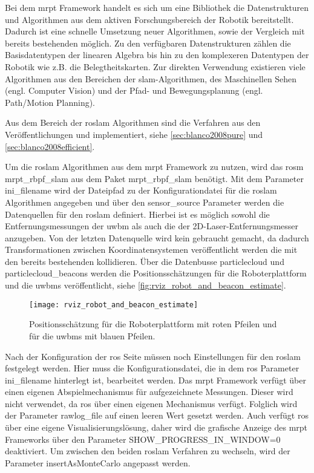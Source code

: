 Bei dem \Gls{mrpt} Framework handelt es sich um eine Bibliothek die Datenstrukturen und Algorithmen aus dem aktiven Forschungsbereich der Robotik bereitstellt. Dadurch ist eine schnelle Umsetzung neuer Algorithmen, sowie der Vergleich mit bereits bestehenden möglich. Zu den verfügbaren Datenstrukturen zählen die Basisdatentypen der linearen Algebra bis hin zu den komplexeren Datentypen der Robotik wie z.B. die Belegtheitskarten. Zur direkten Verwendung existieren viele Algorithmen aus den Bereichen der \Gls{slam}-Algorithmen, des Maschinellen Sehen (engl. Computer Vision) und der Pfad- und Bewegungsplanung (engl. Path/Motion Planning).

Aus dem Bereich der \Gls{roslam} Algorithmen sind die Verfahren aus den Veröffentlichungen  und  implementiert, siehe \autoref{sec:blanco2008pure} und \ref{sec:blanco2008efficient}.

Um die \Gls{roslam} Algorithmen aus dem \Gls{mrpt} Framework zu nutzen, wird das \Gls{rosm} mrpt\_rbpf\_slam aus dem Paket mrpt\_rbpf\_slam benötigt. Mit dem Parameter ini\_filename wird der Dateipfad zu der Konfigurationdatei für die \Gls{roslam} Algorithmen angegeben und über den sensor\_source Parameter werden die Datenquellen für den \Gls{roslam} definiert. Hierbei ist es möglich sowohl die Entfernungsmessungen der \Gls{uwbm} als auch die der 2D-Laser-Entfernungsmesser anzugeben. Von der letzten Datenquelle wird kein gebraucht gemacht, da dadurch Transformationen zwischen Koordinatensystemen veröffentlicht werden die mit den bereits bestehenden kollidieren. Über die Datenbusse particlecloud und particlecloud\_beacons werden die Positionsschätzungen für die Roboterplattform und die \Glspl{uwbm} veröffentlicht, siehe \autoref{fig:rviz_robot_and_beacon_estimate}.

\begin{figure}
	\centering
	\texttt{[image: rviz\_robot\_and\_beacon\_estimate]}
	\caption{Positionsschätzung für die Roboterplattform mit roten Pfeilen und für die \Glspl{uwbm} mit blauen Pfeilen.}
	\label{fig:rviz_robot_and_beacon_estimate}
\end{figure}

Nach der Konfiguration der \Gls{ros} Seite müssen noch Einstellungen für den \Gls{roslam} festgelegt werden. Hier muss die Konfigurationsdatei, die in dem \Gls{ros} Parameter ini\_filename hinterlegt ist, bearbeitet werden. Das \Gls{mrpt} Framework verfügt über einen eigenen Abspielmechanismus für aufgezeichnete Messungen. Dieser wird nicht verwendet, da \Gls{ros} über einen eigenen Mechanismus verfügt. Folglich wird der Parameter rawlog\_file auf einen leeren Wert gesetzt werden. Auch verfügt \Gls{ros} über eine eigene Visualisierungslösung, daher wird die grafische Anzeige des \Gls{mrpt} Frameworks über den Parameter SHOW\_PROGRESS\_IN\_WINDOW=0 deaktiviert. Um zwischen den beiden \Gls{roslam} Verfahren zu wechseln, wird der Parameter insertAsMonteCarlo angepasst werden.

